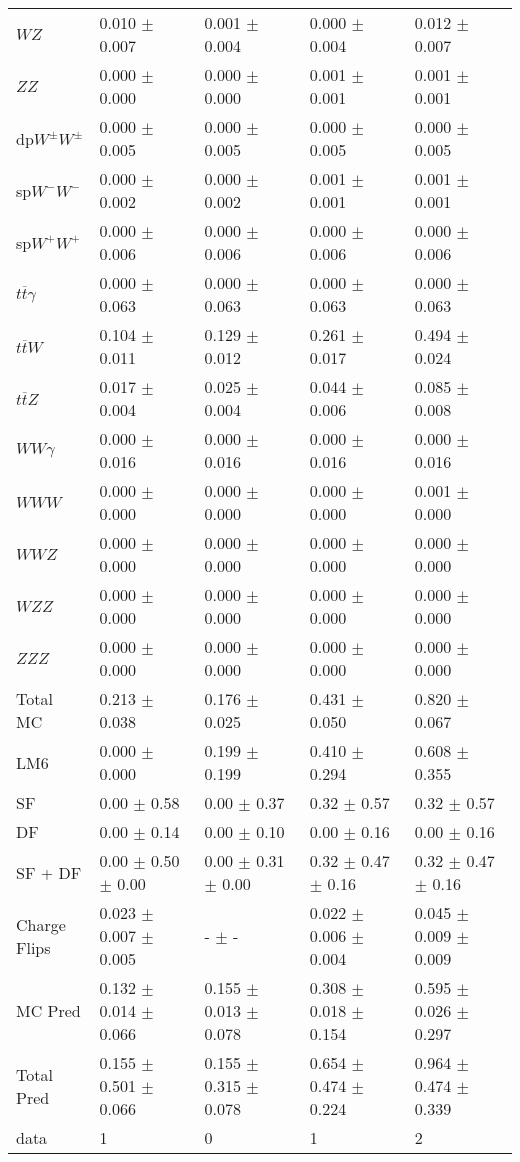 \begin{tabular}{l | l l l l}
$WZ$ &  0.010 $\pm$  0.007 &  0.001 $\pm$  0.004 &   0.000 $\pm$  0.004 &  0.012 $\pm$  0.007\\
$ZZ$ &  0.000 $\pm$   0.000 &  0.000 $\pm$   0.000 &  0.001 $\pm$  0.001 &  0.001 $\pm$  0.001\\
\hline
dp$W^{\pm}W^{\pm}$ &  0.000 $\pm$  0.005 &  0.000 $\pm$  0.005 &  0.000 $\pm$  0.005 &  0.000 $\pm$  0.005\\
sp$W^{-}W^{-}$ &  0.000 $\pm$  0.002 &  0.000 $\pm$  0.002 &  0.001 $\pm$  0.001 &  0.001 $\pm$  0.001\\
sp$W^{+}W^{+}$ &  0.000 $\pm$  0.006 &  0.000 $\pm$  0.006 &  0.000 $\pm$  0.006 &  0.000 $\pm$  0.006\\
$t\overline{t}\gamma$ &  0.000 $\pm$  0.063 &  0.000 $\pm$  0.063 &  0.000 $\pm$  0.063 &  0.000 $\pm$  0.063\\
$t\overline{t}W$ &  0.104 $\pm$  0.011 &  0.129 $\pm$  0.012 &  0.261 $\pm$  0.017 &  0.494 $\pm$  0.024\\
$t\overline{t}Z$ &  0.017 $\pm$  0.004 &  0.025 $\pm$  0.004 &  0.044 $\pm$  0.006 &  0.085 $\pm$  0.008\\
$WW\gamma$ &  0.000 $\pm$  0.016 &  0.000 $\pm$  0.016 &  0.000 $\pm$  0.016 &  0.000 $\pm$  0.016\\
$WWW$ &   0.000 $\pm$   0.000 &   0.000 $\pm$   0.000 &   0.000 $\pm$   0.000 &  0.001 $\pm$   0.000\\
$WWZ$ &  0.000 $\pm$   0.000 &  0.000 $\pm$   0.000 &  0.000 $\pm$   0.000 &  0.000 $\pm$   0.000\\
$WZZ$ &   0.000 $\pm$   0.000 &  0.000 $\pm$   0.000 &   0.000 $\pm$   0.000 &   0.000 $\pm$   0.000\\
$ZZZ$ &  0.000 $\pm$   0.000 &  0.000 $\pm$   0.000 &   0.000 $\pm$   0.000 &   0.000 $\pm$   0.000\\
\hline
Total MC &  0.213 $\pm$  0.038 &  0.176 $\pm$  0.025 &  0.431 $\pm$  0.050 &  0.820 $\pm$  0.067\\
\hline\hline
\hline
LM6 &  0.000 $\pm$  0.000 &  0.199 $\pm$  0.199 &  0.410 $\pm$  0.294 &  0.608 $\pm$  0.355\\
\hline\hline
\hline\hline
 SF  & 0.00 $\pm$ 0.58 & 0.00 $\pm$ 0.37 & 0.32 $\pm$ 0.57 & 0.32 $\pm$ 0.57\\
 DF  & 0.00 $\pm$ 0.14 & 0.00 $\pm$ 0.10 & 0.00 $\pm$ 0.16 & 0.00 $\pm$ 0.16\\
\hline
 SF + DF  & 0.00 $\pm$ 0.50 $\pm$ 0.00 & 0.00 $\pm$ 0.31 $\pm$ 0.00 & 0.32 $\pm$ 0.47 $\pm$ 0.16 & 0.32 $\pm$ 0.47 $\pm$ 0.16\\
\hline\hline
Charge Flips & 0.023 $\pm$ 0.007 $\pm$ 0.005 & - $\pm$ - & 0.022 $\pm$ 0.006 $\pm$ 0.004 & 0.045 $\pm$ 0.009 $\pm$ 0.009\\
\hline\hline
\hline
MC Pred &  0.132 $\pm$  0.014 $\pm$  0.066 &  0.155 $\pm$  0.013 $\pm$  0.078 &  0.308 $\pm$  0.018 $\pm$  0.154 &  0.595 $\pm$  0.026 $\pm$  0.297\\
\hline\hline
Total Pred &  0.155 $\pm$  0.501 $\pm$  0.066 &  0.155 $\pm$  0.315 $\pm$  0.078 &  0.654 $\pm$  0.474 $\pm$  0.224 &  0.964 $\pm$  0.474 $\pm$  0.339\\
\hline\hline
data & 1 & 0 & 1 & 2\\
\hline\hline
\end{tabular}
